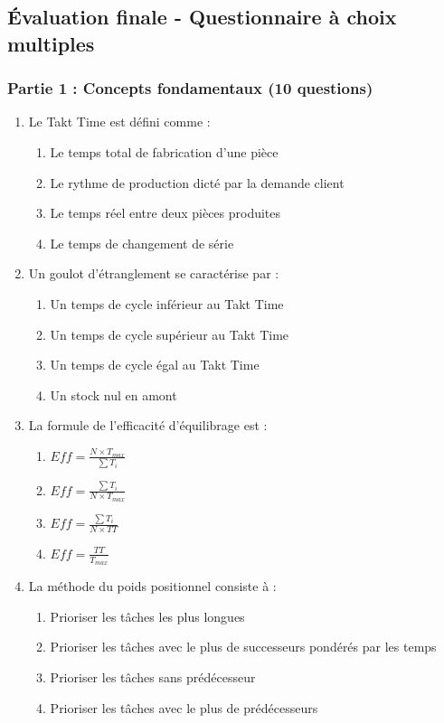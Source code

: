 \documentclass[12pt,a4paper]{article}
\begin{document}
\begin{center}
\subsection{Évaluation finale - Questionnaire à choix multiples}

\subsubsection{Partie 1 : Concepts fondamentaux (10 questions)}

\begin{enumerate}
    \item Le Takt Time est défini comme :
    \begin{enumerate}
        \item Le temps total de fabrication d'une pièce
        \item Le rythme de production dicté par la demande client
        \item Le temps réel entre deux pièces produites
        \item Le temps de changement de série
    \end{enumerate}
    
    \item Un goulot d'étranglement se caractérise par :
    \begin{enumerate}
        \item Un temps de cycle inférieur au Takt Time
        \item Un temps de cycle supérieur au Takt Time
        \item Un temps de cycle égal au Takt Time
        \item Un stock nul en amont
    \end{enumerate}
    
    \item La formule de l'efficacité d'équilibrage est :
    \begin{enumerate}
        \item \(Eff = \frac{N \times T_{max}}{\sum T_i}\)
        \item \(Eff = \frac{\sum T_i}{N \times T_{max}}\)
        \item \(Eff = \frac{\sum T_i}{N \times TT}\)
        \item \(Eff = \frac{TT}{T_{max}}\)
    \end{enumerate}
    
    \item La méthode du poids positionnel consiste à :
    \begin{enumerate}
        \item Prioriser les tâches les plus longues
        \item Prioriser les tâches avec le plus de successeurs pondérés par les temps
        \item Prioriser les tâches sans prédécesseur
        \item Prioriser les tâches avec le plus de prédécesseurs
    \end{enumerate}
    

\end{enumerate}
\end{center}
\end{document}
